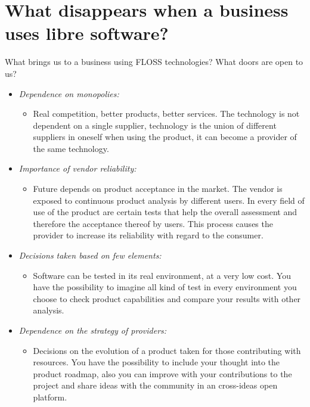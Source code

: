 \section{What disappears when a business uses libre software?}\label{lesson-3-disappears}

What brings us to a business using FLOSS technologies? What doors are open to us?

\begin{itemize}
    \item \emph{Dependence on monopolies:}
    \begin{itemize}
        \item Real competition, better products, better services. The technology is not dependent on a single supplier, technology is the union of different suppliers in oneself when using the product, it can become a provider of the same technology.
    \end{itemize}  
    \item \emph{Importance of vendor reliability:}
    \begin{itemize}
        \item Future depends on product acceptance in the market. The vendor is exposed to continuous product analysis by different users. In every field of use of the product are certain tests that help the overall assessment and therefore the acceptance thereof by users. This process causes the provider to increase its reliability with regard to the consumer.
    \end{itemize}  
    \item \emph{Decisions taken based on few elements:}
    \begin{itemize}
        \item Software can be tested in its real environment, at a very low cost. You have the possibility to imagine all kind of test in every environment you choose to check product capabilities and compare your results with other analysis.
    \end{itemize}  
    \item \emph{Dependence on the strategy of providers:}
    \begin{itemize}
        \item Decisions on the evolution of a product taken for those contributing with resources. You have the possibility to include your thought into the product roadmap, also you can improve with your contributions to the project and share ideas with the community in an cross-ideas open platform.
    \end{itemize}  

\end{itemize}
